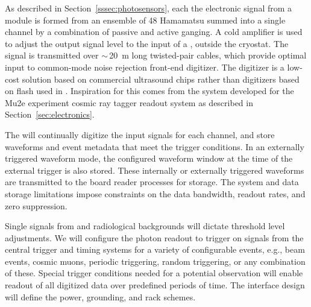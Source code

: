 As described in Section~\ref{sssec:photosensors}, each the electronic signal from a  module is formed from an ensemble of 48 Hamamatsu  summed into a single channel by a combination of passive and active ganging.  A cold amplifier is used to adjust the  output signal level to the input of a  , outside the cryostat. The signal is transmitted over $\sim\,$\SI{20}{m} long twisted-pair cables, which provide  optimal  input to common-mode noise rejection front-end digitizer. 
The digitizer is a low-cost solution based on commercial ultrasound  chips rather than digitizers based on flash  used in . Inspiration for this  comes from the system developed for the Mu2e experiment cosmic ray tagger readout system as described in Section~\ref{sec:electronics}.

The  will continually digitize the input signals for each channel, and store waveforms and  event metadata that meet the trigger conditions. In an externally triggered waveform mode, the configured waveform window at the time of the external trigger is also stored. These internally or externally triggered waveforms are transmitted to the  board reader processes for storage. The  system and data storage limitations impose constraints on the data bandwidth, readout rates, and zero suppression. 

Single \phel signals from  and radiological backgrounds will dictate threshold level adjustments.
We will configure the photon readout to trigger on signals from the central trigger and timing systems for a variety of configurable events, e.g., beam events, cosmic
muons, periodic triggering, random triggering, or any combination of
these. Special trigger conditions needed for a potential  observation will enable readout of all digitized data over predefined periods of time.
The interface design will define the power, grounding, and rack schemes.

